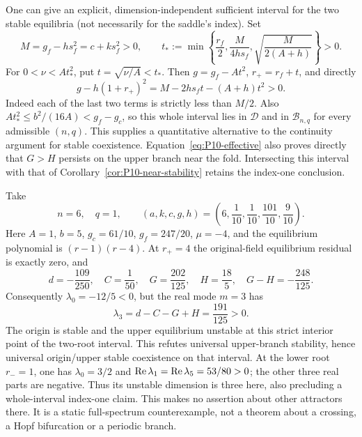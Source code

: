 One can give an explicit, dimension-independent sufficient interval
for the two stable equilibria (not necessarily for the saddle's index).
Set
\begin{equation}
 M=g_f-hs_f^2=c+ks_f^2>0,\qquad
 t_*:=\min\left\{\frac{r_f}{2},\frac{M}{4hs_f},
                         \sqrt{\frac{M}{2(A+h)}}\right\}>0.
 \label{eq:P10-explicit-margin}
\end{equation}
For $0<\nu<A t_*^2$, put $t=\sqrt{\nu/A}<t_*$. Then
$g=g_f-At^2$, $r_+=r_f+t$, and directly
\begin{equation}
 g-h(1+r_+)^2=M-2hs_ft-(A+h)t^2>0.
 \label{eq:P10-explicit-condition}
\end{equation}
Indeed each of the last two terms is strictly less than $M/2$.
Also $At_*^2\le b^2/(16A)<g_f-g_c$, so this whole interval lies
in $\mathcal D$ and in $\mathcal B_{n,q}$ for every admissible
$(n,q)$. This supplies a quantitative alternative to the continuity
argument for stable coexistence. Equation~\eqref{eq:P10-effective}
also proves directly that $G>H$ persists on the upper branch near
the fold. Intersecting this interval with that of
Corollary~\ref{cor:P10-near-stability} retains the index-one conclusion.

\begin{remark}
\label{rem:P10-counterexample}
Take
\begin{equation}
 n=6,\quad q=1,\qquad
 (a,k,c,g,h)=\left(6,\frac1{10},\frac1{10},\frac{101}{10},\frac9{10}\right).
 \label{eq:P10-counterexample}
\end{equation}
Here $A=1$, $b=5$, $g_c=61/10$, $g_f=247/20$, $\mu=-4$,
and the equilibrium polynomial is $(r-1)(r-4)$.
At $r_+=4$ the original-field equilibrium residual is exactly zero,
and
\[
 d=-\frac{109}{250},\quad C=\frac1{50},\quad
 G=\frac{202}{125},\quad H=\frac{18}{5},\quad
 G-H=-\frac{248}{125}.
\]
Consequently $\lambda_0=-12/5<0$, but the real mode $m=3$ has
\begin{equation}
 \lambda_3=d-C-G+H=\frac{191}{125}>0.
 \label{eq:P10-counterexample-mode}
\end{equation}
The origin is stable and the upper equilibrium unstable at this
strict interior point of the two-root interval. This refutes universal
upper-branch stability, hence universal origin/upper stable coexistence
on that interval. At the lower root $r_-=1$, one has
$\lambda_0=3/2$ and $\operatorname{Re}\lambda_1=\operatorname{Re}\lambda_5=53/80>0$;
the other three real parts are negative. Thus its unstable dimension
is three here, also precluding a whole-interval index-one claim.
This makes no assertion about other attractors there.
It is a static full-spectrum counterexample, not a theorem about a
crossing, a Hopf bifurcation or a periodic branch.
\end{remark}

